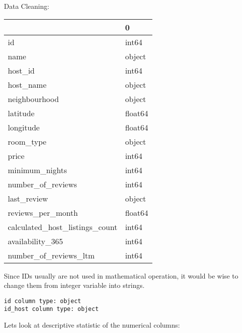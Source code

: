 \documentclass[
  ignorenonframetext,
]{beamer}
\begin{document}
\begin{frame}[fragile]{Data Cleaning:}
\begin{tabular}{ll}
\toprule
{} &        0 \\
\midrule
id                             &    int64 \\
name                           &   object \\
host\_id                        &    int64 \\
host\_name                      &   object \\
neighbourhood                  &   object \\
latitude                       &  float64 \\
longitude                      &  float64 \\
room\_type                      &   object \\
price                          &    int64 \\
minimum\_nights                 &    int64 \\
number\_of\_reviews              &    int64 \\
last\_review                    &   object \\
reviews\_per\_month              &  float64 \\
calculated\_host\_listings\_count &    int64 \\
availability\_365               &    int64 \\
number\_of\_reviews\_ltm          &    int64 \\
\bottomrule
\end{tabular}

Since IDs usually are not used in mathematical operation, it would be
wise to change them from integer variable into strings.

\begin{verbatim}
id column type: object
id_host column type: object
\end{verbatim}

Lets look at descriptive statistic of the numerical columns:


\end{frame}
\end{document}

